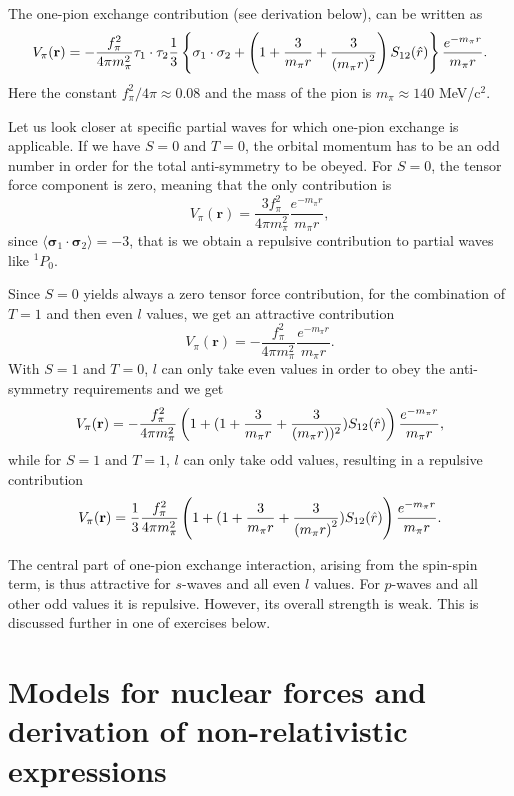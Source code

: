 \documentclass[graybox,sectrefs,envcountresetchap,open=right]{svmonodo}
\begin{document}
The one-pion exchange contribution (see derivation below), can be written as 
\[
V_{\pi}(\mathbf{r})= -\frac{f_{\pi}^{2}}{4\pi m_{\pi}^{2}}\mathbf{ \tau}_1\cdot\mathbf{\tau}_2
\frac{1}{3}\left\{\mathbf{ \sigma}_1\cdot\mathbf{ \sigma}_2+\left( 1 + {3\over m_\pi r} + {3\over\left(m_\pi r\right)^2}\right) S_{12} (\hat r)\right\} \frac{e^{-m_\pi r}}{m_\pi r}.
\]
Here the constant $f_{\pi}^{2}/4\pi\approx 0.08$ and the mass of the pion is $m_\pi\approx 140$ MeV/$\mbox{c}^2$.  

Let us look closer at specific partial waves for which one-pion exchange is applicable. If we have $S=0$ and $T=0$, the 
orbital momentum has to be an odd number in order for the total anti-symmetry to be obeyed. For $S=0$, the tensor force component is zero, meaning that 
the only contribution is 
\[
V_{\pi}(\mathbf{r})=\frac{3f_{\pi}^{2}}{4\pi m_{\pi}^{2}}\frac{e^{-m_\pi r}}{m_\pi r},
\]
since $\langle\mathbf{ \sigma}_1\cdot\mathbf{ \sigma}_2\rangle=-3$, that is we obtain a repulsive contribution to partial waves like 
$^1P_0$.

Since $S=0$ yields always a zero tensor force contribution, for the combination of $T=1$ and then even $l$ values, we get an attractive contribution
\[
V_{\pi}(\mathbf{r})=-\frac{f_{\pi}^{2}}{4\pi m_{\pi}^{2}}\frac{e^{-m_\pi r}}{m_\pi r}.
\]
With $S=1$ and $T=0$, $l$ can only take even values in order to obey the anti-symmetry requirements and we get
\[
V_{\pi}(\mathbf{r})= -\frac{f_{\pi}^{2}}{4\pi m_{\pi}^{2}}
\left(1+( 1 + {3\over m_\pi r} + {3\over\left(m_\pi r\right))^2}) S_{12} (\hat r)\right) \frac{e^{-m_\pi r}}{m_\pi r},
\]
while for $S=1$ and $T=1$, $l$ can only take odd values, resulting in a repulsive contribution 
\[
V_{\pi}(\mathbf{r})= \frac{1}{3}\frac{f_{\pi}^{2}}{4\pi m_{\pi}^{2}}\left(1+( 1 + {3\over m_\pi r} + {3\over\left(m_\pi r\right)^2}) S_{12} (\hat r)\right) \frac{e^{-m_\pi r}}{m_\pi r}.
\]

The central part of one-pion exchange interaction, arising from the spin-spin term,  
is thus attractive for $s$-waves and all even $l$ values. For $p$-waves and all other odd values
it is repulsive. However, its overall strength is weak. This is discussed further in one of exercises below.






\section{Models for nuclear forces and derivation of non-relativistic expressions}
\end{document}
